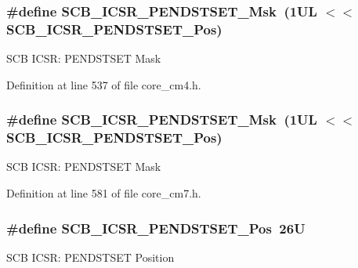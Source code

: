\subsubsection[{\texorpdfstring{S\+C\+B\+\_\+\+I\+C\+S\+R\+\_\+\+P\+E\+N\+D\+S\+T\+S\+E\+T\+\_\+\+Msk}{SCB_ICSR_PENDSTSET_Msk}}]{\setlength{\rightskip}{0pt plus 5cm}\#define S\+C\+B\+\_\+\+I\+C\+S\+R\+\_\+\+P\+E\+N\+D\+S\+T\+S\+E\+T\+\_\+\+Msk~(1\+U\+L $<$$<$ S\+C\+B\+\_\+\+I\+C\+S\+R\+\_\+\+P\+E\+N\+D\+S\+T\+S\+E\+T\+\_\+\+Pos)}\hypertarget{group___c_m_s_i_s___s_c_b_ga7325b61ea0ec323ef2d5c893b112e546}{}\label{group___c_m_s_i_s___s_c_b_ga7325b61ea0ec323ef2d5c893b112e546}
S\+CB I\+C\+SR\+: P\+E\+N\+D\+S\+T\+S\+ET Mask 

Definition at line 537 of file core\+\_\+cm4.\+h.

\subsubsection[{\texorpdfstring{S\+C\+B\+\_\+\+I\+C\+S\+R\+\_\+\+P\+E\+N\+D\+S\+T\+S\+E\+T\+\_\+\+Msk}{SCB_ICSR_PENDSTSET_Msk}}]{\setlength{\rightskip}{0pt plus 5cm}\#define S\+C\+B\+\_\+\+I\+C\+S\+R\+\_\+\+P\+E\+N\+D\+S\+T\+S\+E\+T\+\_\+\+Msk~(1\+U\+L $<$$<$ S\+C\+B\+\_\+\+I\+C\+S\+R\+\_\+\+P\+E\+N\+D\+S\+T\+S\+E\+T\+\_\+\+Pos)}\hypertarget{group___c_m_s_i_s___s_c_b_ga7325b61ea0ec323ef2d5c893b112e546}{}\label{group___c_m_s_i_s___s_c_b_ga7325b61ea0ec323ef2d5c893b112e546}
S\+CB I\+C\+SR\+: P\+E\+N\+D\+S\+T\+S\+ET Mask 

Definition at line 581 of file core\+\_\+cm7.\+h.

\subsubsection[{\texorpdfstring{S\+C\+B\+\_\+\+I\+C\+S\+R\+\_\+\+P\+E\+N\+D\+S\+T\+S\+E\+T\+\_\+\+Pos}{SCB_ICSR_PENDSTSET_Pos}}]{\setlength{\rightskip}{0pt plus 5cm}\#define S\+C\+B\+\_\+\+I\+C\+S\+R\+\_\+\+P\+E\+N\+D\+S\+T\+S\+E\+T\+\_\+\+Pos~26U}\hypertarget{group___c_m_s_i_s___s_c_b_ga9dbb3358c6167c9c3f85661b90fb2794}{}\label{group___c_m_s_i_s___s_c_b_ga9dbb3358c6167c9c3f85661b90fb2794}
S\+CB I\+C\+SR\+: P\+E\+N\+D\+S\+T\+S\+ET Position 

